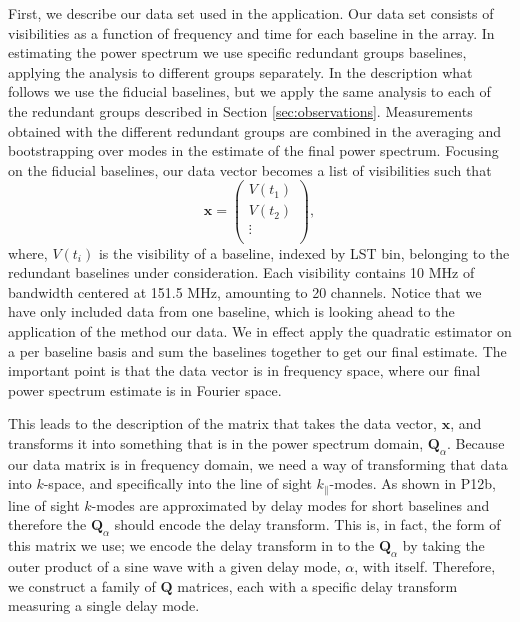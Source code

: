 \documentclass[twocolumn,numberedappendix]{emulateapj} \shorttitle{PSA64}
\begin{document}
First, we describe our data set used in the application. Our data set consists
of visibilities as a function of frequency and time for each baseline in the
array. In estimating the power spectrum we use specific redundant groups baselines,
applying the analysis to different groups separately. In the
description what follows we use the fiducial baselines,
but we apply the same analysis to each of the redundant groups described in Section \ref{sec:observations}.
Measurements obtained with the different redundant groups are combined in the averaging and
bootstrapping over modes in the estimate of the final power spectrum.  Focusing on the fiducial
baselines, our data vector becomes a list of visibilities
such that
\begin{equation}
\label{eqn:xvectdef}
\mathbf{x} = \left( \begin{array}{c}
V (t_{1}) \\
V (t_{2}) \\
\vdots \\
\end{array}
\right), 
\end{equation}
where, $V(t_{i})$ is the visibility of a baseline, indexed by LST bin,
belonging to the redundant baselines under consideration. Each visibility
contains 10 MHz of bandwidth centered at 151.5 MHz, amounting to 20 channels. 
Notice that we have only included data from one baseline, which is looking ahead
to the application of the method our data. We in effect apply the quadratic
estimator on a per baseline basis and sum the baselines together to get our
final estimate. The important point is that the data vector is in frequency
space, where our final power spectrum estimate is in Fourier space. 

This leads to the description of the matrix that takes the data vector,
$\mathbf{x}$, and transforms it into something that is in the power spectrum
domain, $\mathbf{Q}_{\alpha}$. Because our data matrix is in frequency domain,
we need a way of transforming that data into $k$-space, and specifically into
the line of sight $k_{\parallel}$-modes. As shown in P12b,
line of sight $k$-modes are approximated by delay modes for short baselines and
therefore the $\mathbf{Q}_{\alpha}$ should encode the delay transform. This is,
in fact, the form of this matrix we use; we encode the delay transform in to
the $\mathbf{Q}_{\alpha}$ by taking the outer product of a sine wave with a
given delay mode, $\alpha$,  with itself.  Therefore, we construct a family of
$\mathbf{Q}$ matrices, each with a specific delay transform measuring a single
delay mode. 
\end{document}
